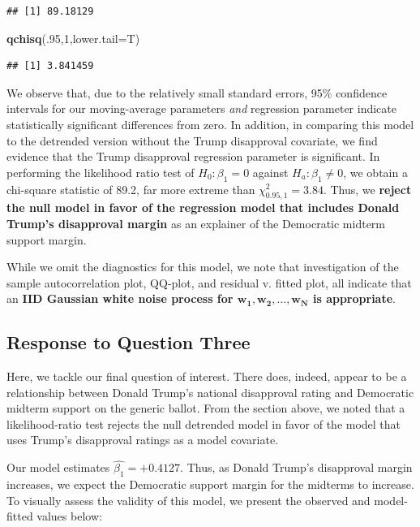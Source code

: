 \documentclass[]{article}
\newenvironment{Shaded}{\begin{snugshade}}{\end{snugshade}}
\newcommand{\KeywordTok}[1]{\textcolor[rgb]{0.13,0.29,0.53}{\textbf{#1}}}
\newcommand{\DataTypeTok}[1]{\textcolor[rgb]{0.13,0.29,0.53}{#1}}
\newcommand{\DecValTok}[1]{\textcolor[rgb]{0.00,0.00,0.81}{#1}}
\newcommand{\NormalTok}[1]{#1}
\begin{document}
\begin{verbatim}
## [1] 89.18129
\end{verbatim}

\begin{Shaded}
\begin{Highlighting}[]
\KeywordTok{qchisq}\NormalTok{(.}\DecValTok{95}\NormalTok{,}\DecValTok{1}\NormalTok{,}\DataTypeTok{lower.tail=}\NormalTok{T)}
\end{Highlighting}
\end{Shaded}

\begin{verbatim}
## [1] 3.841459
\end{verbatim}

We observe that, due to the relatively small standard errors, 95\%
confidence intervals for our moving-average parameters \emph{and}
regression parameter indicate statistically significant differences from
zero. In addition, in comparing this model to the detrended version
without the Trump disapproval covariate, we find evidence that the Trump
disapproval regression parameter is significant. In performing the
likelihood ratio test of \(H_0: \beta_1=0\) against
\(H_a:\beta_1\neq 0\), we obtain a chi-square statistic of 89.2, far
more extreme than \(\chi^2_{0.95,1}=3.84\). Thus, we \textbf{reject the
null model in favor of the regression model that includes Donald Trump's
disapproval margin} as an explainer of the Democratic midterm support
margin.

While we omit the diagnostics for this model, we note that investigation
of the sample autocorrelation plot, QQ-plot, and residual v. fitted
plot, all indicate that an \textbf{IID Gaussian white noise process for
\(\boldsymbol{w_1,w_2,\dots,w_N}\) is appropriate}.

\subsection{Response to Question Three}\label{response-to-question-three}

Here, we tackle our final question of interest. There does, indeed,
appear to be a relationship between Donald Trump's national disapproval
rating and Democratic midterm support on the generic ballot. From the
section above, we noted that a likelihood-ratio test rejects the null
detrended model in favor of the model that uses Trump's disapproval
ratings as a model covariate.

Our model estimates \(\hat{\beta_1} = +0.4127\). Thus, as Donald Trump's
disapproval margin increases, we expect the Democratic support margin
for the midterms to increase. To visually assess the validity of this
model, we present the observed and model-fitted values below:
\end{document}
